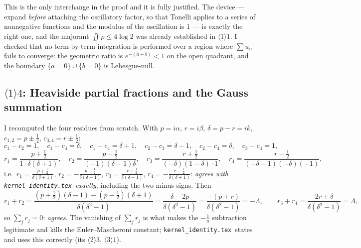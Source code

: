 \documentclass[11pt]{article}
\newcommand{\KI}{\texttt{kernel\_identity.tex}}\newcommand{\NOTE}{\texttt{universality\_normalization.tex}}
\begin{document}

\begin{verdictok}
This is the only interchange in the proof and it is fully justified.  The device --- expand
\emph{before} attaching the oscillatory factor, so that Tonelli applies to a series of nonnegative
functions and the modulus of the oscillation is \(1\) --- is exactly the right one, and the
majorant \(\iint\rho\le4\log2\) was already established in \(\langle1\rangle1\).  I checked
that no term-by-term integration is performed over a region where \(\sum u_n\) fails to converge:
the geometric ratio is \(e^{-(a+b)}<1\) on the open quadrant, and the boundary
\(\{a=0\}\cup\{b=0\}\) is Lebesgue-null.
\end{verdictok}

\subsection{\(\langle1\rangle4\): Heaviside partial fractions and the Gauss summation}

I recomputed the four residues from scratch.  With \(p=i\alpha\), \(r=i\beta\), \(\delta=p-r=ik\),
\(c_{1,2}=p\pm\frac12\), \(c_{3,4}=r\pm\frac12\):
\[
 c_1-c_2=1,\quad c_1-c_3=\delta,\quad c_1-c_4=\delta+1,\quad c_2-c_3=\delta-1,\quad
 c_2-c_4=\delta,\quad c_3-c_4=1,
\]
\[
 r_1=\frac{p+\frac12}{1\cdot\delta(\delta+1)},\quad
 r_2=\frac{p-\frac12}{(-1)(\delta-1)\delta},\quad
 r_3=\frac{r+\frac12}{(-\delta)(1-\delta)\cdot1},\quad
 r_4=\frac{r-\frac12}{(-\delta-1)(-\delta)(-1)},
\]
i.e.\ \(r_1=\frac{p+\frac12}{\delta(\delta+1)}\), \(r_2=-\frac{p-\frac12}{\delta(\delta-1)}\),
\(r_3=\frac{r+\frac12}{\delta(\delta-1)}\), \(r_4=-\frac{r-\frac12}{\delta(\delta+1)}\):
\emph{agrees with \KI\ exactly}, including the two minus signs.  Then
\[
 r_1+r_2=\frac{(p+\frac12)(\delta-1)-(p-\frac12)(\delta+1)}{\delta(\delta^2-1)}
 =\frac{\delta-2p}{\delta(\delta^2-1)}=\frac{-(p+r)}{\delta(\delta^2-1)}=-\Lambda,\qquad
 r_3+r_4=\frac{2r+\delta}{\delta(\delta^2-1)}=\Lambda,
\]
so \(\sum_jr_j=0\): \emph{agrees}.  The vanishing of \(\sum_jr_j\) is what makes the
\(-\frac1n\) subtraction legitimate and kills the Euler--Mascheroni constant; \KI\ states and uses
this correctly (its \(\langle2\rangle3\), \(\langle3\rangle1\)).
\end{document}
